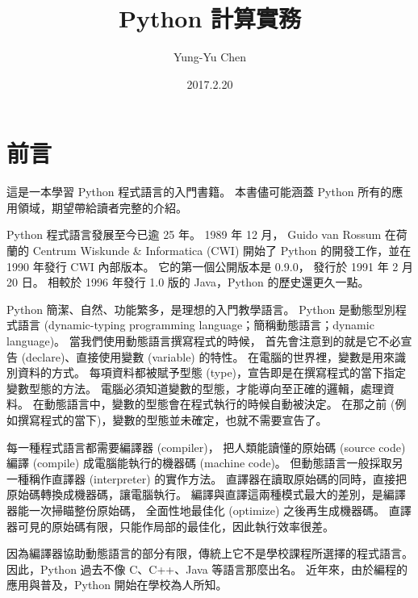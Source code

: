 \documentclass[a4paper,12pt]{book}
\theoremstyle{definition}
\begin{document}
\title{Python 計算實務}
\author{Yung-Yu Chen}
\date{2017.2.20}

\maketitle

\tableofcontents

\hspace{.5cm}

\frontmatter

\chapter{前言}

這是一本學習 Python 程式語言的入門書籍。
本書儘可能涵蓋 Python 所有的應用領域，期望帶給讀者完整的介紹。

%
%

Python 程式語言發展至今已逾 25 年。
1989 年 12 月，
Guido van Rossum 在荷蘭的 Centrum Wiskunde \& Informatica (CWI) 開始了
Python 的開發工作，並在 1990 年發行 CWI 內部版本。
它的第一個公開版本是 0.9.0，
發行於 1991 年 2 月 20 日\cite{rossum_brief_2009}。
相較於 1996 年發行 1.0 版的 Java，Python 的歷史還更久一點。

Python 簡潔、自然、功能繁多，是理想的入門教學語言。
Python 是動態型別程式語言
(dynamic-typing programming language；簡稱動態語言；dynamic language)。
當我們使用動態語言撰寫程式的時候，
首先會注意到的就是它不必宣告 (declare)、直接使用變數 (variable) 的特性。
在電腦的世界裡，變數是用來識別資料的方式。
每項資料都被賦予型態 (type)，宣告即是在撰寫程式的當下指定變數型態的方法。
電腦必須知道變數的型態，才能導向至正確的邏輯，處理資料。
在動態語言中，變數的型態會在程式執行的時候自動被決定。
在那之前 (例如撰寫程式的當下)，變數的型態並未確定，也就不需要宣告了。

每一種程式語言都需要編譯器 (compiler)，
把人類能讀懂的原始碼 (source code)
編譯 (compile) 成電腦能執行的機器碼 (machine code)。
但動態語言一般採取另一種稱作直譯器 (interpreter) 的實作方法。
直譯器在讀取原始碼的同時，直接把原始碼轉換成機器碼，讓電腦執行。
編譯與直譯這兩種模式最大的差別，是編譯器能一次掃瞄整份原始碼，
全面性地最佳化 (optimize) 之後再生成機器碼。
直譯器可見的原始碼有限，只能作局部的最佳化，因此執行效率很差。

因為編譯器協助動態語言的部分有限，傳統上它不是學校課程所選擇的程式語言。
因此，Python 過去不像 C、C++、Java 等語言那麼出名。
近年來，由於編程的應用與普及，Python 開始在學校為人所知。
\end{document}
